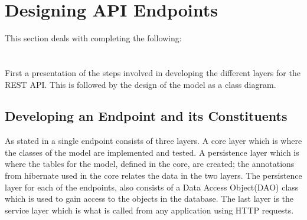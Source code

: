 \section{Designing API Endpoints}\label{sec:generalEP}
This section deals with completing the following: \\
 \\
 \\
\noindent
First a presentation of the steps involved in developing the different layers for the REST API.
This is followed by the design of the model as a class diagram.

\subsection{Developing an Endpoint and its Constituents}\label{subsec:general}
As stated in  a single endpoint consists of three layers.
A core layer which is where the classes of the model are implemented and tested.
A persistence layer which is where the tables for the model, defined in the core, are created; the annotations from hibernate used in the core relates the data in the two layers.
The persistence layer for each of the endpoints, also consists of a Data Access Object(DAO) class which is used to gain access to the objects in the database.
The last layer is the service layer which is what is called from any application using HTTP requests.

